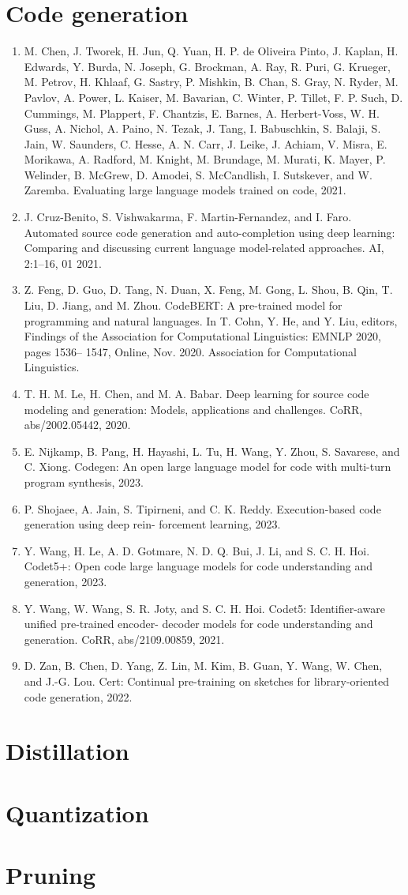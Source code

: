 \documentclass[]{article}
\begin{document}
\section{Code generation}
\begin{enumerate}
\item M. Chen, J. Tworek, H. Jun, Q. Yuan, H. P. de Oliveira Pinto, J. Kaplan, H. Edwards, Y. Burda,
N. Joseph, G. Brockman, A. Ray, R. Puri, G. Krueger, M. Petrov, H. Khlaaf, G. Sastry, P. Mishkin,
B. Chan, S. Gray, N. Ryder, M. Pavlov, A. Power, L. Kaiser, M. Bavarian, C. Winter, P. Tillet, F. P.
Such, D. Cummings, M. Plappert, F. Chantzis, E. Barnes, A. Herbert-Voss, W. H. Guss, A. Nichol,
A. Paino, N. Tezak, J. Tang, I. Babuschkin, S. Balaji, S. Jain, W. Saunders, C. Hesse, A. N. Carr,
J. Leike, J. Achiam, V. Misra, E. Morikawa, A. Radford, M. Knight, M. Brundage, M. Murati, K. Mayer,
P. Welinder, B. McGrew, D. Amodei, S. McCandlish, I. Sutskever, and W. Zaremba. Evaluating large
language models trained on code, 2021.
\item J. Cruz-Benito, S. Vishwakarma, F. Martin-Fernandez, and I. Faro. Automated source code generation
and auto-completion using deep learning: Comparing and discussing current language model-related
approaches. AI, 2:1–16, 01 2021.
\item  Z. Feng, D. Guo, D. Tang, N. Duan, X. Feng, M. Gong, L. Shou, B. Qin, T. Liu, D. Jiang, and M. Zhou.
CodeBERT: A pre-trained model for programming and natural languages. In T. Cohn, Y. He, and
Y. Liu, editors, Findings of the Association for Computational Linguistics: EMNLP 2020, pages 1536–
1547, Online, Nov. 2020. Association for Computational Linguistics.
\item T. H. M. Le, H. Chen, and M. A. Babar. Deep learning for source code modeling and generation: Models,
applications and challenges. CoRR, abs/2002.05442, 2020.
\item E. Nijkamp, B. Pang, H. Hayashi, L. Tu, H. Wang, Y. Zhou, S. Savarese, and C. Xiong. Codegen: An
open large language model for code with multi-turn program synthesis, 2023.
\item  P. Shojaee, A. Jain, S. Tipirneni, and C. K. Reddy. Execution-based code generation using deep rein-
forcement learning, 2023.
\item Y. Wang, H. Le, A. D. Gotmare, N. D. Q. Bui, J. Li, and S. C. H. Hoi. Codet5+: Open code large
language models for code understanding and generation, 2023.
\item  Y. Wang, W. Wang, S. R. Joty, and S. C. H. Hoi. Codet5: Identifier-aware unified pre-trained encoder-
decoder models for code understanding and generation. CoRR, abs/2109.00859, 2021.
\item D. Zan, B. Chen, D. Yang, Z. Lin, M. Kim, B. Guan, Y. Wang, W. Chen, and J.-G. Lou. Cert: Continual
pre-training on sketches for library-oriented code generation, 2022.
\end{enumerate}
\section{Distillation}
\section{Quantization}
\section{Pruning}
\end{document}
